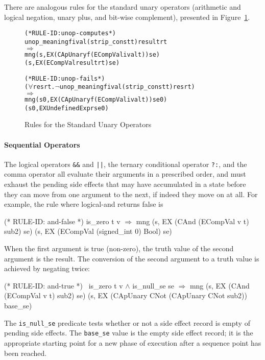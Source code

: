 \documentclass[11pt]{article}
\begin{document}
There are analogous rules for the standard unary operators (arithmetic
and logical negation, unary plus, and bit-wise complement), presented
in Figure~\ref{fig:capunary-rules}.
\begin{figure}[htbp]
%
%
%
\begin{alltt}
(* RULE-ID: unop-computes *)
     unop_meaning f ival (strip_const t) result rt
   \(\Rightarrow\)
     mng (s, EX (CApUnary f (ECompVal ival t)) se)
         (s, EX (ECompVal result rt) se)
\end{alltt}

\begin{alltt}
(* RULE-ID: unop-fails *)
     (\(\forall\)res rt. \(\neg\)unop_meaning f ival (strip_const t) res rt)
   \(\Rightarrow\)
     mng (s0, EX (CApUnary f (ECompVal ival t)) se0)
         (s0, EX UndefinedExpr se0)
\end{alltt}
\caption{Rules for the Standard Unary Operators}
\label{fig:capunary-rules}
\end{figure}

\paragraph{Sequential Operators}
The logical operators \texttt{\&\&} and \texttt{||}, the ternary
conditional operator \texttt{?:}, and the comma operator all evaluate
their arguments in a prescribed order, and must exhaust the pending
side effects that may have accumulated in a state before they can move
from one argument to the next, if indeed they move on at all.   For
example, the rule where logical-and returns false is
\begin{stdrule}
(* RULE-ID: and-false *)
     is_zero t v
   \(\Rightarrow\)
     mng (s, EX (CAnd (ECompVal v t) sub2) se)
         (s, EX (ECompVal (signed_int 0) Bool) se)
\end{stdrule}%
When the first argument is true (non-zero), the truth value of the
second argument is the result.  The conversion of the second argument
to a truth value is achieved by negating twice:
\begin{stdrule}
(* RULE-ID: and-true *)
     ~is_zero t v \(\land\)
     is_null_se se
   \(\Rightarrow\)
     mng (s, EX (CAnd (ECompVal v t) sub2) se)
         (s, EX (CApUnary CNot (CApUnary CNot sub2)) base_se)
\end{stdrule}
%
%
The \texttt{is_null_se} predicate tests whether or not a side effect
record is empty of pending side effects.
%
The \texttt{base_se} value is the empty side effect record; it is the
appropriate starting point for a new phase of execution after a
sequence point has been reached.
\end{document}
